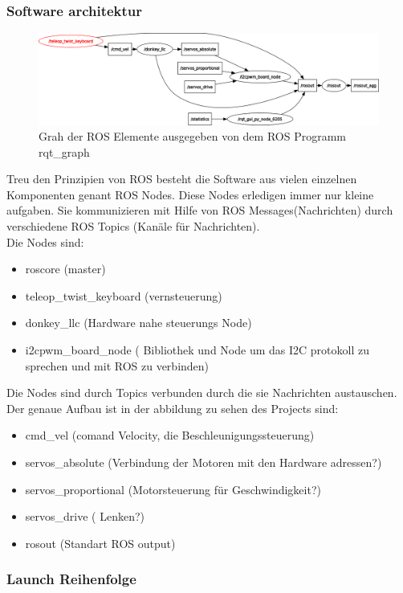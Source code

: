 \documentclass[a4paper,11pt]{article}
\theoremstyle{mytheor}
\begin{document}
\subsubsection{Software architektur}

\begin{figure}[h]
	\includegraphics[width=\linewidth]{img/Robot_auto_RQT.png}
	\caption{Grah der ROS Elemente ausgegeben von dem ROS Programm rqt\_graph}
	\label{fig3: RQT}	
\end{figure}

Treu den Prinzipien von ROS besteht die Software aus vielen einzelnen Komponenten genant ROS Nodes. Diese Nodes erledigen immer nur kleine aufgaben. Sie kommunizieren mit Hilfe von ROS Messages(Nachrichten) durch verschiedene ROS Topics (Kanäle für Nachrichten).\\
Die Nodes sind:
\begin{itemize}
	\item roscore (master) 
	\item teleop\_twist\_keyboard (vernsteuerung)
	\item donkey\_llc (Hardware nahe steuerungs Node)
	\item i2cpwm\_board\_node ( Bibliothek und Node um das I2C protokoll zu sprechen und mit ROS zu verbinden)
\end{itemize}
\par
Die Nodes sind durch Topics verbunden durch die sie Nachrichten austauschen. Der genaue Aufbau ist in der abbildung zu sehen des Projects sind: 
\begin{itemize}
	\item cmd\_vel (comand Velocity, die Beschleunigungssteuerung) 
	\item servos\_absolute (Verbindung der Motoren mit den Hardware adressen?)
	\item servos\_proportional (Motorsteuerung für Geschwindigkeit?)
	\item servos\_drive ( Lenken?) 
	\item rosout (Standart ROS output)
\end{itemize}


\subsubsection{Launch Reihenfolge}
\end{document}
